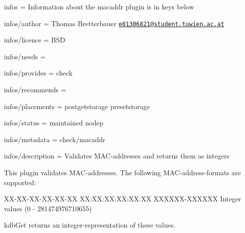 
\begin{DoxyItemize}
\item infos = Information about the macaddr plugin is in keys below
\item infos/author = Thomas Bretterbauer \href{mailto:e01306821@student.tuwien.ac.at}{\tt e01306821@student.\+tuwien.\+ac.\+at}
\item infos/licence = B\+SD
\item infos/needs =
\item infos/provides = check
\item infos/recommends =
\item infos/placements = postgetstorage presetstorage
\item infos/status = maintained nodep
\item infos/metadata = check/macaddr
\item infos/description = Validates M\+A\+C-\/addresses and returns them as integers
\end{DoxyItemize}

This plugin validates M\+A\+C-\/addresses. The following M\+A\+C-\/address-\/formats are supported\+: \begin{DoxyVerb}XX-XX-XX-XX-XX-XX
XX:XX:XX:XX:XX:XX
XXXXXX-XXXXXX
Integer values (0 - 281474976710655)
\end{DoxyVerb}


{\ttfamily kdb\+Get} returns an integer-\/representation of these values.


